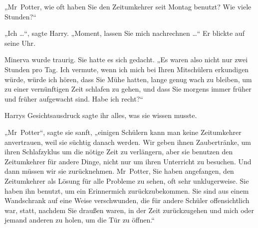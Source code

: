 „Mr~Potter, wie oft haben Sie den Zeitumkehrer seit Montag benutzt? Wie viele Stunden?“

„Ich …“, sagte Harry.
„Moment, lassen Sie mich nachrechnen …“ Er blickte auf seine Uhr.

Minerva wurde traurig. Sie hatte es sich gedacht.
„Es waren also nicht nur zwei Stunden pro Tag. Ich vermute, wenn ich mich bei Ihren Mitschülern erkundigen würde, würde ich hören, dass Sie Mühe hatten, lange genug wach zu bleiben, um zu einer vernünftigen Zeit schlafen zu gehen, und dass Sie morgens immer früher und früher aufgewacht sind. Habe ich recht?“

Harrys Gesichtsausdruck sagte ihr alles, was sie wissen musste.

„Mr~Potter“, sagte sie sanft, „einigen Schülern kann man keine Zeitumkehrer anvertrauen, weil sie süchtig danach werden. Wir geben ihnen Zaubertränke, um ihren Schlafzyklus um die nötige Zeit zu verlängern, aber sie benutzen den Zeitumkehrer für andere Dinge, nicht nur um ihren Unterricht zu besuchen. Und dann müssen wir sie zurücknehmen. Mr~Potter, Sie haben angefangen, den Zeitumkehrer als Lösung für alle Probleme zu sehen, oft sehr unklugerweise. Sie haben ihn benutzt, um ein Erinnermich zurückzubekommen. Sie sind aus einem Wandschrank auf eine Weise verschwunden, die für andere Schüler offensichtlich war, statt, nachdem Sie draußen waren, in der Zeit zurückzugehen und mich oder jemand anderen zu holen, um die Tür zu öffnen.“

